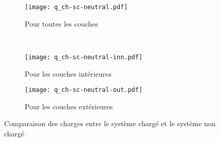 \begin{figure}[h!]
    \centering
    \begin{subfigure}[t]{.49 \textwidth}
        \centering
        \texttt{[image: q\_ch-sc-neutral.pdf]}
        \caption{Pour toutes les couches}
    \end{subfigure}%
    ~
    \begin{subfigure}[t]{.49 \textwidth}
        \centering
        \texttt{[image: q\_ch-sc-neutral-inn.pdf]}
        \caption{Pour les couches intérieures}
    \end{subfigure}

    \begin{subfigure}[t]{.49 \textwidth}
        \centering
        \texttt{[image: q\_ch-sc-neutral-out.pdf]}
        \caption{Pour les couches extérieures}
    \end{subfigure}
    \caption{Comparaison des charges entre le système chargé et le système non chargé}
    \label{fig:comparaison_ch-sc-neutral}
\end{figure}

